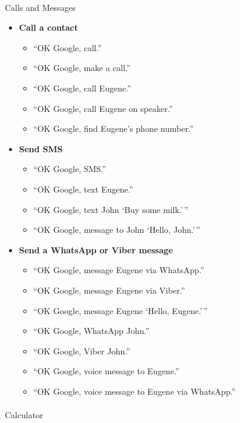\documentclass[
  a4paper,
]{article}
\makeatletter
\let\oldparagraph\paragraph
\renewcommand{\paragraph}{
    \@ifstar
      \xxxParagraphStar
      \xxxParagraphNoStar
  }
\newcommand{\xxxParagraphStar}[1]{\oldparagraph*{#1}\mbox{}}
\newcommand{\xxxParagraphNoStar}[1]{\oldparagraph{#1}\mbox{}}
\providecommand{\tightlist}{%
  \setlength{\itemsep}{0pt}\setlength{\parskip}{0pt}}\usepackage{longtable,booktabs,array}
\makeatother
\begin{document}
\paragraph{Calls and Messages}\label{calls-and-messages}

\begin{itemize}
\tightlist
\item
  \textbf{Call a contact}

  \begin{itemize}
  \tightlist
  \item
    ``OK Google, call.''
  \item
    ``OK Google, make a call.''
  \item
    ``OK Google, call Eugene.''
  \item
    ``OK Google, call Eugene on speaker.''
  \item
    ``OK Google, find Eugene's phone number.''
  \end{itemize}
\item
  \textbf{Send SMS}

  \begin{itemize}
  \tightlist
  \item
    ``OK Google, SMS.''
  \item
    ``OK Google, text Eugene.''
  \item
    ``OK Google, text John `Buy some milk.'\,''
  \item
    ``OK Google, message to John `Hello, John.'\,''
  \end{itemize}
\item
  \textbf{Send a WhatsApp or Viber message}

  \begin{itemize}
  \tightlist
  \item
    ``OK Google, message Eugene via WhatsApp.''
  \item
    ``OK Google, message Eugene via Viber.''
  \item
    ``OK Google, message Eugene `Hello, Eugene.'\,''
  \item
    ``OK Google, WhatsApp John.''
  \item
    ``OK Google, Viber John.''
  \item
    ``OK Google, voice message to Eugene.''
  \item
    ``OK Google, voice message to Eugene via WhatsApp.''
  \end{itemize}
\end{itemize}

\paragraph{Calculator}\label{calculator}
\end{document}
